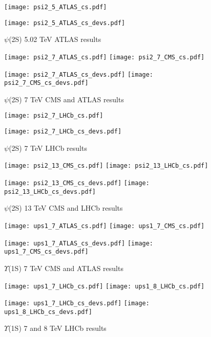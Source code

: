 \documentclass{article}
\begin{document}
\clearpage

\begin{figure}
\centering
\texttt{[image: psi2\_5\_ATLAS\_cs.pdf]}

\texttt{[image: psi2\_5\_ATLAS\_cs\_devs.pdf]}
\caption{$\psi$(2S) 5.02 TeV ATLAS results}
\end{figure}

\clearpage

\begin{figure}
\centering
\texttt{[image: psi2\_7\_ATLAS\_cs.pdf]}
\texttt{[image: psi2\_7\_CMS\_cs.pdf]}

\texttt{[image: psi2\_7\_ATLAS\_cs\_devs.pdf]}
\texttt{[image: psi2\_7\_CMS\_cs\_devs.pdf]}
\caption{$\psi$(2S) 7 TeV CMS and ATLAS results}
\end{figure}

\clearpage

\begin{figure}
\centering
\texttt{[image: psi2\_7\_LHCb\_cs.pdf]}

\texttt{[image: psi2\_7\_LHCb\_cs\_devs.pdf]}
\caption{$\psi$(2S) 7 TeV LHCb results}
\end{figure}

\clearpage

\begin{figure}
\centering
\texttt{[image: psi2\_13\_CMS\_cs.pdf]}
\texttt{[image: psi2\_13\_LHCb\_cs.pdf]}

\texttt{[image: psi2\_13\_CMS\_cs\_devs.pdf]}
\texttt{[image: psi2\_13\_LHCb\_cs\_devs.pdf]}
\caption{$\psi$(2S) 13 TeV CMS and LHCb results}
\end{figure}

\clearpage

\begin{figure}
\centering
\texttt{[image: ups1\_7\_ATLAS\_cs.pdf]}
\texttt{[image: ups1\_7\_CMS\_cs.pdf]}

\texttt{[image: ups1\_7\_ATLAS\_cs\_devs.pdf]}
\texttt{[image: ups1\_7\_CMS\_cs\_devs.pdf]}
\caption{$\Upsilon$(1S) 7 TeV CMS and ATLAS results}
\end{figure}

\clearpage

\begin{figure}
\centering
\texttt{[image: ups1\_7\_LHCb\_cs.pdf]}
\texttt{[image: ups1\_8\_LHCb\_cs.pdf]}

\texttt{[image: ups1\_7\_LHCb\_cs\_devs.pdf]}
\texttt{[image: ups1\_8\_LHCb\_cs\_devs.pdf]}
\caption{$\Upsilon$(1S) 7 and 8 TeV LHCb results}
\end{figure}
\end{document}
